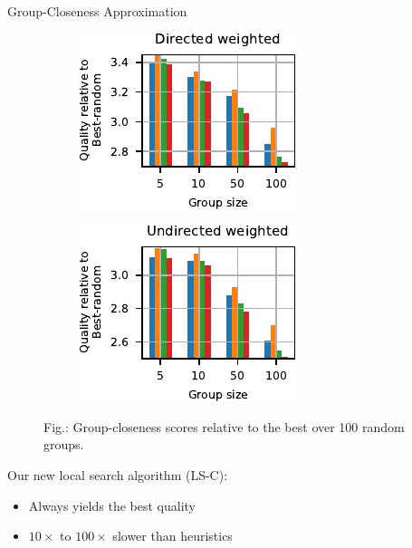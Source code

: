\documentclass[10pt,titlepage,english,presentation]{beamer}
\begin{document}
\begin{frame}[t]{Group-Closeness Approximation}
\begin{minipage}[t]{.55\textwidth}
\begin{figure}
\begin{subfigure}[t]{.5\textwidth}
\centering
\includegraphics[width=.9\textwidth]{../sources/plots/gh-gc-apx/quality-high-diameter-directed-weighted.pdf}
\end{subfigure}\hfill
\begin{subfigure}[t]{.5\textwidth}
\centering
\includegraphics[width=.9\textwidth]{../sources/plots/gh-gc-apx/quality-high-diameter-undirected-weighted.pdf}
\end{subfigure}
\caption*{\scriptsize Fig.: Group-closeness scores relative to the best over 100 random groups.}
\end{figure}
\end{minipage}\hfill
\begin{minipage}[t]{.4\textwidth}
\scriptsize
Our new local search algorithm (\textsc{LS-C}):
\begin{itemize}
\scriptsize
\item[\faThumbsOUp] Always yields the best quality
\item[\faThumbsODown] $10\times$ to $100\times$ slower than heuristics
\end{itemize}\bigskip


\end{minipage}
\end{frame}
\end{document}
